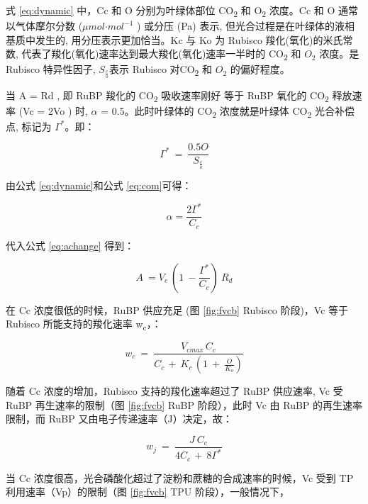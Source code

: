 \documentclass[]{krantz}
\theoremstyle{definition}
\theoremstyle{definition}
\theoremstyle{definition}
\theoremstyle{remark}
\begin{document}
式 \eqref{eq:dynamic} 中，Cc 和 O 分别为叶绿体部位 CO\textsubscript{2} 和
O\textsubscript{2} 浓度。Cc 和 O 通常以气体摩尔分数
(\(\mu mol\text{·}mol^{-1}\) ) 或分压 (Pa) 表示,
但光合过程是在叶绿体的液相基质中发生的, 用分压表示更加恰当。Kc 与 Ko 为
Rubisco 羧化(氧化)的米氏常数,
代表了羧化(氧化)速率达到最大羧化(氧化)速率一半时的 CO\textsubscript{2}
和 \(O_{2}\) 浓度。是 Rubisco 特异性因子, \(S_{\frac{c}{o}}\)表示
Rubisco 对CO\textsubscript{2} 和 \(O_{2}\) 的偏好程度。

当 A = Rd , 即 RuBP 羧化的 CO\textsubscript{2} 吸收速率刚好 等于 RuBP
氧化的 CO\textsubscript{2} 释放速率 (Vc = 2Vo ) 时, \(\alpha\) =
0.5。此时叶绿体的 CO\textsubscript{2} 浓度就是叶绿体 CO\textsubscript{2}
光合补偿点, 标记为 \(\Gamma^{*}\)。即：

\begin{equation}
\Gamma^{*}\ =\ \frac{0.5O}{S_{\frac{c}{o}}}
\label{eq:com}
\end{equation}

由公式 \eqref{eq:dynamic}和公式 \eqref{eq:com}可得：

\begin{equation}
\alpha =\frac{2\Gamma^{*}}{C_{c}}
\label{eq:combine}
\end{equation}

代入公式 \eqref{eq:achange} 得到：

\begin{equation}
A\ =V_{c}\ (1\ -\frac{\Gamma^{*}}{C_{c}})\ R_{d}
\label{eq:combine2}
\end{equation}

在 Cc 浓度很低的时候，RuBP 供应充足 (图 \ref{fig:fvcb} Rubisco 阶段)，Vc
等于 Rubisco 所能支持的羧化速率 w\textsubscript{c}，：

\begin{equation}
w_{c}\ =\ \frac{V_{cmax\ }C_{c}}{C_{c\ }+\ K_{c\ }(1\ +\ \frac{O}{K_{o}})}
\label{eq:wc}
\end{equation}

随着 Cc 浓度的增加，Rubisco 支持的羧化速率超过了 RuBP 供应速率, Vc 受
RuBP 再生速率的限制（图 \ref{fig:fvcb} RuBP 阶段），此时 Vc 由 RuBP
的再生速率限制，而 RuBP 又由电子传递速率（J）决定，故：

\begin{equation}
w_{j}\ =\ \frac{J\ C_{c}}{4C_{c\ }+\ 8\Gamma^{*}}
\label{eq:wj}
\end{equation}

当 Cc 浓度很高，光合磷酸化超过了淀粉和蔗糖的合成速率的时候，Vc 受到 TP
利用速率（Vp）的限制（图 \ref{fig:fvcb} TPU 阶段），一般情况下，
\end{document}
